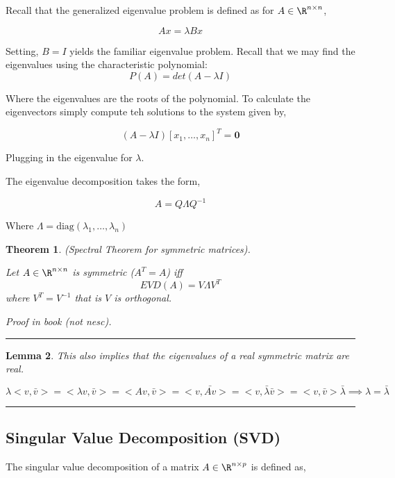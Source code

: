 \documentclass[twoside]{article}
\newtheorem{theorem}{Theorem}[section]
\newtheorem{lemma}[theorem]{Lemma}
\newenvironment{proof}{{\bf Proof:}}{\hfill\rule{2mm}{2mm}}
\begin{document}
Recall that the generalized eigenvalue problem is defined as for $A \in \R^{n\times n}$,

\begin{equation}
Ax = \lambda Bx
\end{equation}

Setting, $B=I$ yields the familiar eigenvalue problem. Recall that we may find the eigenvalues using the characteristic polynomial: $$P(A) = det(A-\lambda I)$$

 Where the eigenvalues are the roots of the polynomial. To calculate the eigenvectors simply compute teh solutions to the system given by,

 $$(A-\lambda I)[x_1, \dots, x_n]^T = \textbf{0}$$

 Plugging in the eigenvalue for $\lambda$.

The eigenvalue decomposition takes the form,

\begin{equation}
A = Q\Lambda Q^{-1}
\end{equation}

 Where $\Lambda = \text{diag}(\lambda_1, \dots, \lambda_n)$

\begin{theorem}{(Spectral Theorem for symmetric matrices).}

Let $A\in\R^{n\times n}$ is symmetric ($A^T = A$) iff $$EVD(A) = V\Lambda V^T$$ where $V^T = V^{-1}$ that is $V$ is orthogonal.

\begin{proof}
Proof in book (not nesc).
\end{proof}
\end{theorem}

\begin{lemma}
This also implies that the eigenvalues of a real symmetric matrix are real.

\begin{proof}
$\lambda <v,\bar{v}> = <\lambda v,\bar{v}> = <Av,\bar{v}> = <v,\bar{Av}> = <v,\bar{\lambda}\bar{v}> = <v,\bar{v}>\bar{\lambda} \implies \lambda = \bar{\lambda}$
\end{proof}
\end{lemma}

\subsection{Singular Value Decomposition (SVD)}

The singular value decomposition of a matrix $A\in\R^{n \times p}$ is defined as,
\end{document}
